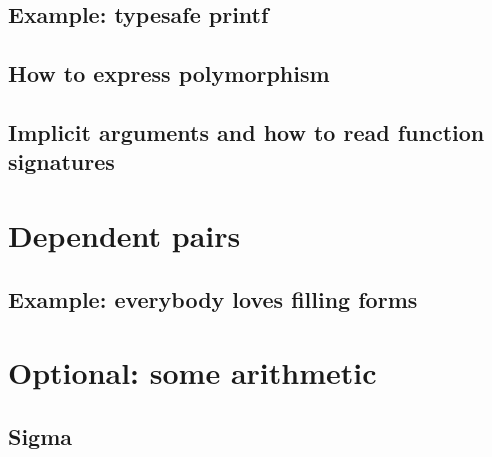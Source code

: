 \documentclass{beamer}
\begin{document}

\subsection{Example: typesafe printf}

\subsection{How to express polymorphism}

\subsection{Implicit arguments and how to read function signatures}

\section{Dependent pairs}

\subsection{Example: everybody loves filling forms}

\section{Optional: some arithmetic}

\subsection{Sigma}
\end{document}
